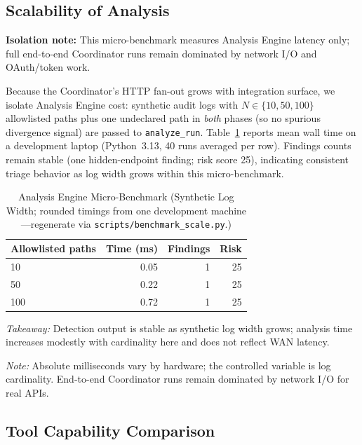 \documentclass[conference]{IEEEtran}
\begin{document}
\subsection{Scalability of Analysis}
\label{sec:scale}

\textbf{Isolation note:} This micro-benchmark measures Analysis Engine
latency only; full end-to-end Coordinator runs remain dominated by network
I/O and OAuth/token work.

Because the Coordinator's HTTP fan-out grows with integration surface,
we isolate Analysis Engine cost: synthetic audit logs with
$N \in \{10,50,100\}$ allowlisted paths plus one undeclared path in
\emph{both} phases (so no spurious divergence signal) are passed to
\texttt{analyze\_run}. Table~\ref{tab:scale} reports mean wall time on a
development laptop (Python~3.13, 40 runs averaged per row). Findings
counts remain stable (one hidden-endpoint finding; risk score 25),
indicating consistent triage behavior as log width grows within this
micro-benchmark.

\begin{table}[htbp]
  \caption{Analysis Engine Micro-Benchmark (Synthetic Log Width;
  rounded timings from one development machine---regenerate via
  \texttt{scripts/benchmark\_scale.py}.)}
  \label{tab:scale}
  \centering
  \renewcommand{\arraystretch}{1.2}
  \footnotesize
  \begin{tabular}{@{}lrrr@{}}
    \toprule
    \textbf{Allowlisted paths} & \textbf{Time (ms)} & \textbf{Findings} & \textbf{Risk} \\
    \midrule
    10  & 0.05  & 1 & 25 \\
    50  & 0.22  & 1 & 25 \\
    100 & 0.72  & 1 & 25 \\
    \bottomrule
  \end{tabular}
\end{table}

\noindent\textit{Takeaway:} Detection output is stable as synthetic log
width grows; analysis time increases modestly with cardinality here and
does not reflect WAN latency.

\noindent\textit{Note:} Absolute milliseconds vary by hardware; the
controlled variable is log cardinality. End-to-end Coordinator runs
remain dominated by network I/O for real APIs.

\subsection{Tool Capability Comparison}
\label{sec:toolcompeval}
\end{document}

